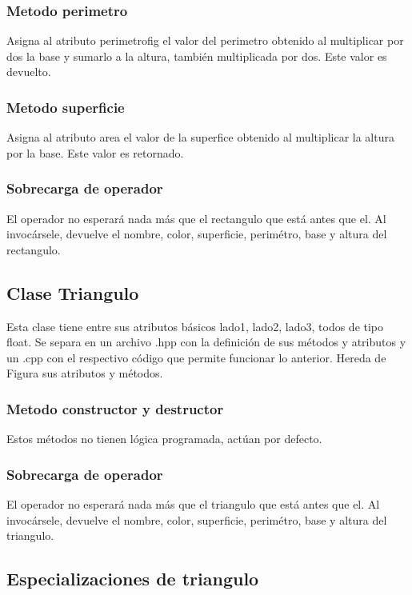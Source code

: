 \documentclass[11pt]{article}
\begin{document}
\subsubsection{Metodo perimetro}
	Asigna al atributo perimetrofig el valor del perimetro obtenido al multiplicar por dos la base y sumarlo a la altura, también multiplicada por dos. Este valor es devuelto.

\subsubsection{Metodo superficie}
	Asigna al atributo area el valor de la superfice obtenido al multiplicar la altura por la base. Este valor es retornado.

\subsubsection{Sobrecarga de operador ~}
	El operador no esperará nada más que el rectangulo que está antes que el. Al invocársele, devuelve el nombre, color, superficie, perimétro, base y altura del rectangulo.

\subsection{Clase Triangulo}
	Esta clase tiene entre sus atributos básicos lado1, lado2, lado3, todos de tipo float. Se separa en un archivo .hpp con la definición de sus métodos y atributos y un .cpp con el respectivo código que permite funcionar lo anterior. Hereda de Figura sus atributos y métodos.

\subsubsection{Metodo constructor y destructor}
	Estos métodos no tienen lógica programada, actúan por defecto.

\subsubsection{Sobrecarga de operador ~}
	El operador no esperará nada más que el triangulo que está antes que el. Al invocársele, devuelve el nombre, color, superficie, perimétro, base y altura del triangulo.

\subsection{Especializaciones de triangulo}
\end{document}
